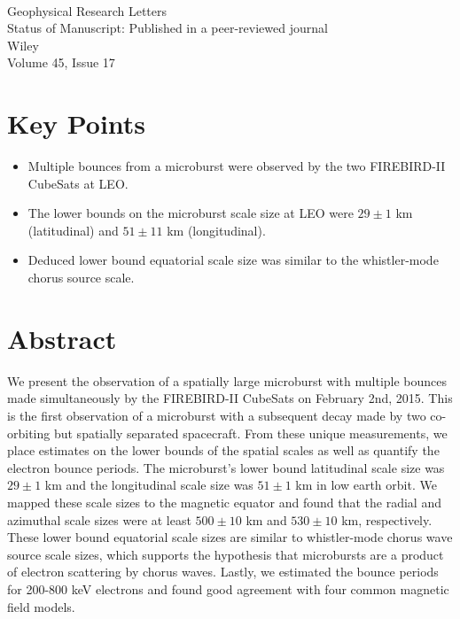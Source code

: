  \\
Geophysical Research Letters \\
Status of Manuscript: Published in a peer-reviewed journal \\
Wiley \\
Volume 45, Issue 17

\newpage

\section{Key Points}
\begin{itemize}
\item Multiple bounces from a microburst were observed by the two FIREBIRD-II CubeSats at LEO.
\item The lower bounds on the microburst scale size at LEO were $29 \pm 1$ km (latitudinal) and $51 \pm 11$ km (longitudinal).
\item Deduced lower bound equatorial scale size was similar to the whistler-mode chorus source scale.
\end{itemize}

%
%


\section{Abstract}
We present the observation of a spatially large microburst with multiple bounces made simultaneously by the FIREBIRD-II CubeSats on February 2nd, 2015. This is the first observation of a microburst with a subsequent decay made by two co-orbiting but spatially separated spacecraft. From these unique measurements, we place estimates on the lower bounds of the spatial scales as well as quantify the electron bounce periods. The microburst's lower bound latitudinal scale size was $29 \pm 1$ km and the longitudinal scale size was $51 \pm 1$  km in low earth orbit. We mapped these scale sizes to the magnetic equator and found that the radial and azimuthal scale sizes were at least $500 \pm​ 10$ km and $530 \pm 10$ km, respectively. These lower bound equatorial scale sizes are similar to whistler-mode chorus wave source scale sizes, which supports the hypothesis that microbursts are a product of electron scattering by chorus waves. Lastly, we estimated the bounce periods for 200-800 keV electrons and found good agreement with four common magnetic field models.

